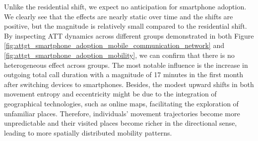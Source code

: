 Unlike the residential shift, we expect no anticipation for smartphone adoption.
We clearly see that the effects are nearly static over time and the shifts are positive, but the magnitude is relatively small compared to the residential shift.
By inspecting ATT dynamics across different groups demonstrated in both Figure \ref{fig:attgt_smartphone_adoption_mobile_communication_network} and \ref{fig:attgt_smartphone_adoption_mobility}, we can confirm that there is no heterogeneous effect across groups.
The most notable influence is the increase in outgoing total call duration with a magnitude of 17 minutes in the first month after switching devices to smartphones.
Besides, the modest upward shifts in both movement entropy and eccentricity might be due to the integration of geographical technologies, such as online maps, facilitating the exploration of unfamiliar places.
Therefore, individuals' movement trajectories become more unpredictable and their visited places become richer in the directional sense, leading to more spatially distributed mobility patterns.
